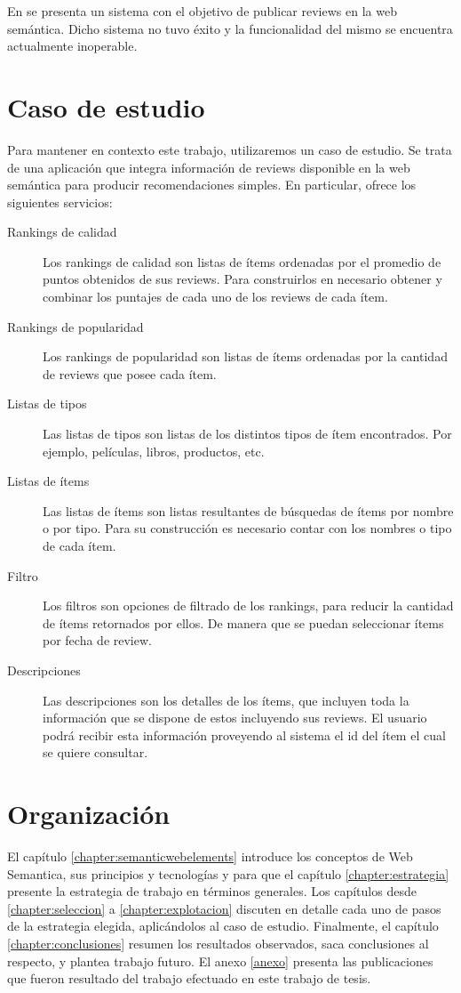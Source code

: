 En \cite{Heath2006} se presenta un sistema con el objetivo de publicar reviews en la web semántica. Dicho sistema no tuvo éxito
y la funcionalidad del mismo se encuentra actualmente inoperable.

\section{Caso de estudio}
\label{section:caso-de-estudio}
Para mantener en contexto este trabajo, utilizaremos un caso de estudio. Se trata de una aplicación que integra información de reviews disponible en la web semántica para producir recomendaciones simples. En particular, ofrece los siguientes servicios: 

\begin{description}
\item[Rankings de calidad ] Los rankings de calidad son listas de ítems ordenadas por el promedio de puntos 
obtenidos de sus reviews. Para construirlos en necesario obtener y combinar los puntajes de cada uno
de los reviews de cada ítem.
\item[Rankings de popularidad] Los rankings de popularidad son listas de ítems ordenadas por la cantidad
de reviews que posee cada ítem.
\item[Listas de tipos] Las listas de tipos son listas de los distintos tipos de ítem encontrados. 
Por ejemplo, películas, libros, productos, etc.
\item[Listas de ítems] Las listas de ítems son listas resultantes de búsquedas de ítems por nombre o por tipo. 
Para su construcción es necesario contar con los nombres o tipo de cada ítem.
\item[Filtro] Los filtros son opciones de filtrado de los rankings, para reducir la cantidad 
de ítems retornados por ellos. De manera que se puedan seleccionar ítems por fecha de review.
\item[Descripciones] Las descripciones son los detalles de los ítems, que incluyen toda la información que se dispone de estos 
incluyendo sus reviews. El usuario podrá recibir esta información proveyendo al sistema el id del ítem el cual se quiere consultar.
 
\end{description}


\section{Organización}
\label{section:organizacion}

 El capítulo \ref{chapter:semanticwebelements} introduce los conceptos de Web Semantica, sus principios y tecnologías y para que el capítulo \ref{chapter:estrategia} presente la estrategia de trabajo en términos generales. Los capítulos desde \ref{chapter:seleccion} a \ref{chapter:explotacion} discuten en detalle cada uno de pasos de la estrategia elegida, aplicándolos al caso de estudio. Finalmente, el capítulo \ref{chapter:conclusiones} resumen los resultados observados, saca conclusiones al respecto, y plantea trabajo futuro. El anexo \ref{anexo} presenta las publicaciones que fueron resultado del trabajo efectuado en este trabajo de tesis. 



